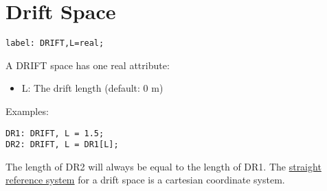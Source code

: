 
\section{Drift Space}

\begin{verbatim}
label: DRIFT,L=real;
\end{verbatim} 

A DRIFT space has one real attribute: 
\begin{itemize}
   \item L: The drift length (default: 0 m) 
\end{itemize} 

Examples: 
\begin{verbatim}
DR1: DRIFT, L = 1.5;
DR2: DRIFT, L = DR1[L];
\end{verbatim} 

The length of DR2 will always be equal to the length of DR1. The
\href{../Introduction/local_system.html#straight}{straight  reference
  system} for a drift space is a cartesian coordinate system.  

